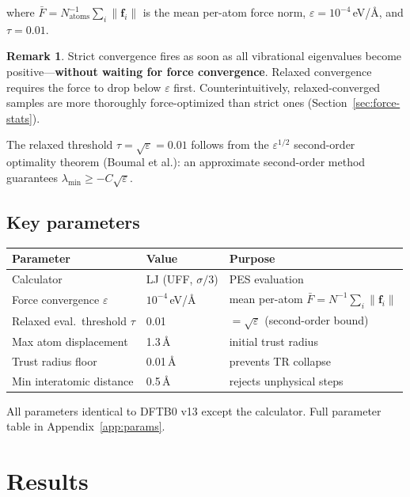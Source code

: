 \documentclass[11pt,a4paper]{article}
\newcommand{\vect}[1]{\bm{#1}}
\newcommand{\norm}[1]{\lVert #1 \rVert}
\theoremstyle{definition}
\newtheorem{remark}{Remark}
\begin{document}
\noindent
where $\bar{F} = N_\text{atoms}^{-1}\sum_i \norm{\vect{f}_i}$ is the
mean per-atom force norm, $\varepsilon = 10^{-4}$\,eV/\AA, and
$\tau = 0.01$.

\begin{remark}
Strict convergence fires as soon as all vibrational eigenvalues become
positive---\textbf{without waiting for force convergence}.  Relaxed
convergence requires the force to drop below $\varepsilon$ first.
Counterintuitively, relaxed-converged samples are more thoroughly
force-optimized than strict ones (Section~\ref{sec:force-stats}).
\end{remark}

\noindent
The relaxed threshold $\tau = \sqrt{\varepsilon} = 0.01$ follows from the
$\varepsilon^{1/2}$ second-order optimality theorem (Boumal et al.):
an approximate second-order method guarantees
$\lambda_\text{min} \geq -C\sqrt{\varepsilon}$.

\subsection{Key parameters}
\label{sec:params}

\begin{center}\small
\begin{tabular}{lll}
\toprule
Parameter & Value & Purpose \\
\midrule
Calculator & LJ (UFF, $\sigma/3$) & PES evaluation \\
Force convergence $\varepsilon$ & $10^{-4}$\,eV/\AA & mean per-atom $\bar{F} = N^{-1}\sum_i\norm{\vect{f}_i}$ \\
Relaxed eval.\ threshold $\tau$ & 0.01 & $= \sqrt{\varepsilon}$ (second-order bound) \\
Max atom displacement & 1.3\,\AA & initial trust radius \\
Trust radius floor & 0.01\,\AA & prevents TR collapse \\
Min interatomic distance & 0.5\,\AA & rejects unphysical steps \\
\bottomrule
\end{tabular}
\end{center}

\noindent All parameters identical to DFTB0 v13 except the calculator.
Full parameter table in Appendix~\ref{app:params}.

\section{Results}
\label{sec:results}
\end{document}
